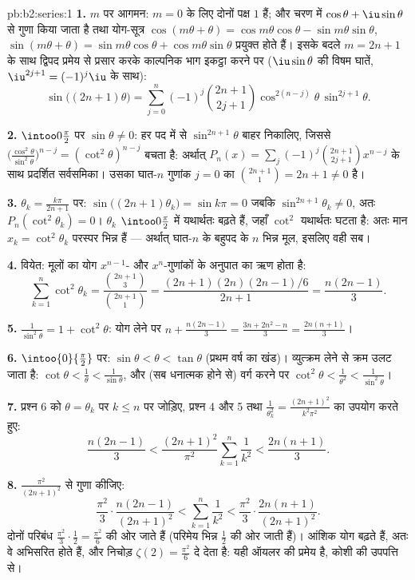 \begin{solution}{pb:b2:series:1}
\textbf{1.} $m$ पर आगमन: $m = 0$ के लिए दोनों पक्ष $1$ हैं; और चरण में $\cos\theta + \iu\sin\theta$
से गुणा किया जाता है तथा योग-सूत्र $\cos(m\theta + \theta) =
\cos m\theta\cos\theta - \sin m\theta\sin\theta$, $\sin(m\theta
+ \theta) = \sin m\theta\cos\theta + \cos m\theta\sin\theta$ प्रयुक्त होते हैं। इसके
बदले $m = 2n+1$ के साथ द्विपद प्रमेय से प्रसार करके काल्पनिक भाग इकट्ठा करने पर
($\iu\sin\theta$ की विषम घातें, $\iu^{2j+1} = (-1)^j\iu$ के साथ):
\[
\sin\bigl((2n{+}1)\theta\bigr) = \sum_{j=0}^{n}(-1)^j
\binom{2n+1}{2j+1}\cos^{2(n-j)}\theta\,\sin^{2j+1}\theta .
\]

\textbf{2.} $\intoo0{\frac\pi2}$ पर $\sin\theta \neq 0$: हर पद में से $\sin^{2n+1}\theta$ बाहर निकालिए, जिससे $\bigl(\frac{\cos^2\theta}{\sin^2\theta}\bigr)^{n-j} =
(\cot^2\theta)^{n-j}$ बचता
है: अर्थात् $P_n(x) =
\sum_j(-1)^j\binom{2n+1}{2j+1}x^{n-j}$ के साथ प्रदर्शित सर्वसमिका। उसका घात-$n$ गुणांक $j = 0$ का
$\binom{2n+1}{1} = 2n + 1 \neq 0$ है।

\textbf{3.} $\theta_k = \frac{k\pi}{2n+1}$ पर: $\sin\bigl((2n{+}1)\theta_k\bigr) = \sin k\pi = 0$ जबकि $\sin^{2n+1}\theta_k \neq 0$, अतः $P_n(\cot^2\theta_k) = 0$। $\theta_k$ $\intoo0{\frac\pi2}$ में यथार्थतः बढ़ते
हैं, जहाँ $\cot^2$ यथार्थतः घटता है: अतः मान $x_k =
\cot^2\theta_k$ परस्पर भिन्न हैं ---
अर्थात् घात-$n$ के बहुपद के $n$ भिन्न मूल, इसलिए वही सब।

\textbf{4.} वियेत: मूलों का योग $x^{n-1}$- और $x^n$-गुणांकों के अनुपात का ऋण
होता है:
\[
\sum_{k=1}^{n}\cot^2\theta_k =
\frac{\binom{2n+1}{3}}{\binom{2n+1}{1}}
= \frac{(2n+1)(2n)(2n-1)/6}{2n+1} = \frac{n(2n-1)}{3}.
\]

\textbf{5.} $\frac{1}{\sin^2\theta} = 1 + \cot^2\theta$: योग लेने पर $n + \frac{n(2n-1)}3 = \frac{3n + 2n^2 - n}{3} =
\frac{2n(n+1)}{3}$।

\textbf{6.} $\intoo{0}{\frac\pi2}$ पर: $\sin\theta < \theta <
\tan\theta$ (प्रथम वर्ष का खंड)। व्युत्क्रम लेने से क्रम उलट
जाता है: $\cot\theta < \frac1\theta < \frac1{\sin\theta}$, और (सब धनात्मक होने से) वर्ग करने पर $\cot^2\theta < \frac1{\theta^2} <
\frac1{\sin^2\theta}$।

\textbf{7.} प्रश्न 6 को $\theta = \theta_k$ पर $k \leq
n$ पर जोड़िए, प्रश्न 4 और 5 तथा $\frac1{\theta_k^2} =
\frac{(2n+1)^2}{k^2\pi^2}$ का
उपयोग करते हुए:
\[
\frac{n(2n-1)}3 < \frac{(2n+1)^2}{\pi^2}\sum_{k=1}^n\frac1{k^2}
< \frac{2n(n+1)}3 .
\]

\textbf{8.} $\frac{\pi^2}{(2n+1)^2}$ से गुणा कीजिए:
\[
\frac{\pi^2}{3}\cdot\frac{n(2n-1)}{(2n+1)^2}
< \sum_{k=1}^{n}\frac1{k^2} <
\frac{\pi^2}{3}\cdot\frac{2n(n+1)}{(2n+1)^2}.
\]
दोनों परिबंध $\frac{\pi^2}3\cdot\frac12 = \frac{\pi^2}6$ की ओर जाते हैं (परिमेय भिन्न $\frac12$ की ओर जाती हैं)।
आंशिक योग बढ़ते हैं, अतः वे अभिसरित होते हैं, और निचोड़ $\zeta(2) =
\frac{\pi^2}6$ दे देता है:
यही ऑयलर की प्रमेय है, कोशी की उपपत्ति से।


\end{solution}
